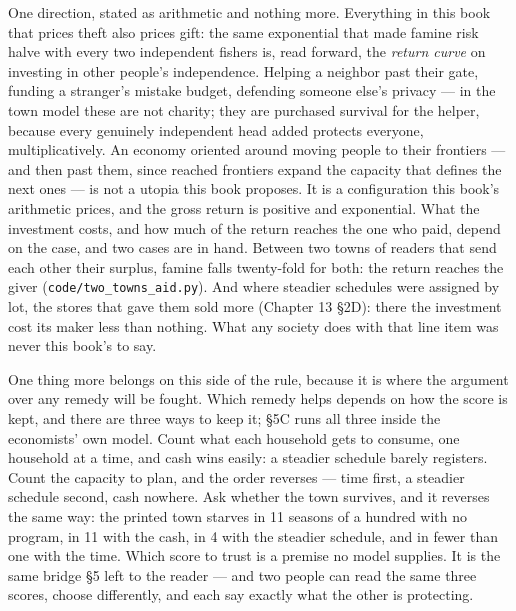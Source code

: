 
One direction, stated as arithmetic and nothing more. Everything in
this book that prices theft also prices gift: the same exponential
that made famine risk halve with every two independent fishers is,
read forward, the \emph{return curve} on investing in other people's
independence. Helping a neighbor past their gate, funding a stranger's
mistake budget, defending someone else's privacy --- in the town model
these are not charity; they are purchased survival for the helper,
because every genuinely independent head added protects everyone,
multiplicatively. An economy oriented around moving people to their
frontiers --- and then past them, since reached frontiers expand the
capacity that defines the next ones --- is not a utopia this book
proposes. It is a configuration this book's arithmetic prices, and
the gross return is positive and exponential. What the investment costs, and how much of the return
reaches the one who paid, depend on the case, and two cases are in
hand. Between two towns of readers that send each other their surplus,
famine falls twenty-fold for both: the return reaches the giver
(\texttt{code/\allowbreak{}two\_\allowbreak{}towns\_\allowbreak{}aid.\allowbreak{}py}). And where steadier schedules were assigned
by lot, the stores that gave them sold more (Chapter 13 §2D): there
the investment cost its maker less than nothing. What any society does with that line item was never
this book's to say.

One thing more belongs on this side of the rule, because it is where
the argument over any remedy will be fought. Which remedy helps
depends on how the score is kept, and there are three ways to keep it;
§5C runs all three inside the economists' own model. Count what each
household gets to consume, one household at a time, and cash wins
easily: a steadier schedule barely registers. Count the capacity to
plan, and the order reverses --- time first, a steadier schedule second,
cash nowhere. Ask whether the town survives, and it reverses the same
way: the printed town starves in 11 seasons of a hundred with no
program, in 11 with the cash, in 4 with the steadier schedule, and in
fewer than one with the time. Which score to trust is a premise no
model supplies. It is the same bridge §5 left to the reader --- and two
people can read the same three scores, choose differently, and each
say exactly what the other is protecting.


